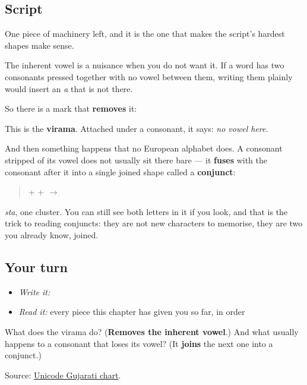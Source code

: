 \subsection*{Script}
One piece of machinery left, and it is the one that makes the script's hardest shapes make sense.

The inherent vowel is a nuisance when you do not want it. If a word has two consonants pressed together with no vowel between them, writing them plainly would insert an \emph{a} that is not there.

So there is a mark that \textbf{removes} it:

\begin{quote}
\end{quote}

This is the \textbf{virama}. Attached under a consonant, it says: \emph{no vowel here.}

And then something happens that no European alphabet does. A consonant stripped of its vowel does not usually sit there bare — it \textbf{fuses} with the consonant after it into a single joined shape called a \textbf{conjunct}:

\begin{quote}
\textbf{} + \textbf{} + \textbf{} $\to$ \textbf{}
\end{quote}

\emph{sta}, one cluster. You can still see both letters in it if you look, and that is the trick to reading conjuncts: they are not new characters to memorise, they are two you already know, joined.

\subsection*{Your turn}
\begin{itemize}
\raggedright
  \item \emph{Write it:} 
  \item \emph{Read it:} every piece this chapter has given you so far, in order
\end{itemize}

\begin{tcolorbox}[breakable,colback=teal!4,colframe=teal!35!black,title={Before you move on}]
What does the virama do? (\textbf{Removes the inherent vowel}.) And what usually happens to a consonant that loses its vowel? (It \textbf{joins} the next one into a conjunct.)

Source: \href{https://www.unicode.org/charts/PDF/U0A80.pdf}{Unicode Gujarati chart}.
\end{tcolorbox}
